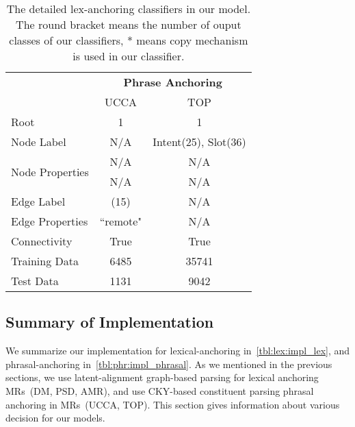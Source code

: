 \begin{table}[!ht]
\caption{The detailed lex-anchoring classifiers in our model. The round bracket means the number of ouput classes of our classifiers, * means copy mechanism is
  used in our classifier.}
\label{tbl:phr:impl_phrasal}
\begin{center}
\begin{tabular}{l|cc}
\toprule
\hline
                                 & \multicolumn{2}{c}{{\bf Phrase Anchoring}} \\ \cline{2-3}
                                 & UCCA      & TOP                            \\ \hline
Root                             & 1         & 1                              \\ \hline
Node Label                       & N/A       & Intent(25), Slot(36)           \\ \hline
\multirow{2}{*}{Node Properties} & N/A       & N/A                            \\
                                 & N/A       & N/A                            \\ \hline
Edge Label                       & (15)      & N/A                            \\ \hline
Edge Properties                  & ``remote" & N/A                            \\ \hline
Connectivity                     & True      & True                           \\ \hline
Training Data                    & 6485      & 35741                          \\ \hline
Test Data                        & 1131      & 9042                           \\ \hline \bottomrule
\end{tabular}
\end{center}
\label{tbl:phr:impl_phrasal}
\end{table}

\subsection{Summary of Implementation}
\label{ssec:impl_summary}

We summarize our implementation for lexical-anchoring
in~\autoref{tbl:lex:impl_lex}, and phrasal-anchoring
in~\autoref{tbl:phr:impl_phrasal}. As we mentioned in the previous
sections, we use latent-alignment graph-based parsing for lexical
anchoring MRs~(DM, PSD, AMR), and use CKY-based constituent parsing
phrasal anchoring in MRs~(UCCA, TOP). This section gives information
about various decision for our models.

